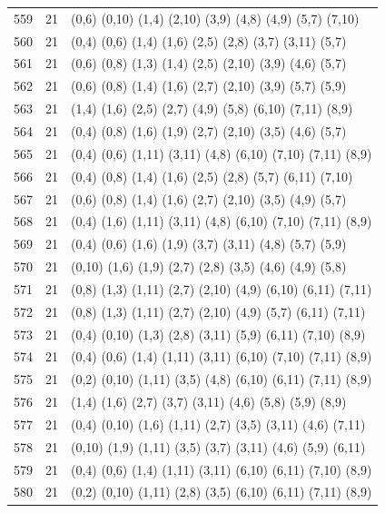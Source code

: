 \begin{appendix}
{\begin{longtable}{lll}
559& 21 & (0,6)   (0,10) (1,4)  (2,10)  (3,9)   (4,8)   (4,9)   (5,7)   (7,10)\\
560& 21 & (0,4)   (0,6)  (1,4)  (1,6)   (2,5)   (2,8)   (3,7)   (3,11)  (5,7)\\
561& 21 & (0,6)   (0,8)  (1,3)  (1,4)   (2,5)   (2,10)  (3,9)   (4,6)   (5,7)\\
562& 21 & (0,6)   (0,8)  (1,4)  (1,6)   (2,7)   (2,10)  (3,9)   (5,7)   (5,9)\\
563& 21 & (1,4)   (1,6)  (2,5)  (2,7)   (4,9)   (5,8)   (6,10)  (7,11)  (8,9)\\
564& 21 & (0,4)   (0,8)  (1,6)  (1,9)   (2,7)   (2,10)  (3,5)   (4,6)   (5,7)\\
565& 21 & (0,4)   (0,6)  (1,11) (3,11)  (4,8)   (6,10)  (7,10)  (7,11)  (8,9)\\
566& 21 & (0,4)   (0,8)  (1,4)  (1,6)   (2,5)   (2,8)   (5,7)   (6,11)  (7,10)\\
567& 21 & (0,6)   (0,8)  (1,4)  (1,6)   (2,7)   (2,10)  (3,5)   (4,9)   (5,7)\\
568& 21 & (0,4)   (1,6)  (1,11) (3,11)  (4,8)   (6,10)  (7,10)  (7,11)  (8,9)\\
569& 21 & (0,4)   (0,6)  (1,6)  (1,9)   (3,7)   (3,11)  (4,8)   (5,7)   (5,9)\\
570& 21 & (0,10)  (1,6)  (1,9)  (2,7)   (2,8)   (3,5)   (4,6)   (4,9)   (5,8)\\
571& 21 & (0,8)   (1,3)  (1,11) (2,7)   (2,10)  (4,9)   (6,10)  (6,11)  (7,11)\\
572& 21 & (0,8)   (1,3)  (1,11) (2,7)   (2,10)  (4,9)   (5,7)   (6,11)  (7,11)\\
573& 21 & (0,4)   (0,10) (1,3)  (2,8)   (3,11)  (5,9)   (6,11)  (7,10)  (8,9)\\
574& 21 & (0,4)   (0,6)  (1,4)  (1,11)  (3,11)  (6,10)  (7,10)  (7,11)  (8,9)\\
575& 21 & (0,2)   (0,10) (1,11) (3,5)   (4,8)   (6,10)  (6,11)  (7,11)  (8,9)\\
576& 21 & (1,4)   (1,6)  (2,7)  (3,7)   (3,11)  (4,6)   (5,8)   (5,9)   (8,9)\\
577& 21 & (0,4)   (0,10) (1,6)  (1,11)  (2,7)   (3,5)   (3,11)  (4,6)   (7,11)\\
578& 21 & (0,10)  (1,9)  (1,11) (3,5)   (3,7)   (3,11)  (4,6)   (5,9)   (6,11)\\
579& 21 & (0,4)   (0,6)  (1,4)  (1,11)  (3,11)  (6,10)  (6,11)  (7,10)  (8,9)\\
580& 21 & (0,2)   (0,10) (1,11) (2,8)   (3,5)   (6,10)  (6,11)  (7,11)  (8,9)\\

\end{longtable}}
\end{appendix}
